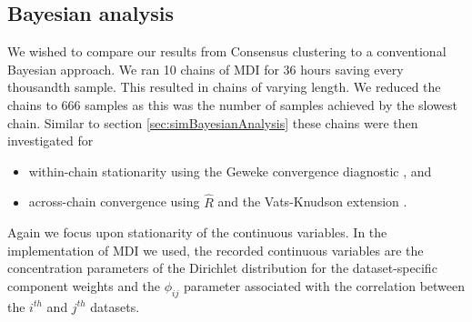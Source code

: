 \documentclass[]{article}
\begin{document}
\subsection{Bayesian analysis} \label{sec:yeastBayesianAnalysis}
We wished to compare our results from Consensus clustering to a conventional Bayesian approach. We ran 10 chains of MDI for 36 hours saving every thousandth sample. This resulted in chains of varying length. We reduced the chains to 666 samples as this was the number of samples achieved by the slowest chain. Similar to section \ref{sec:simBayesianAnalysis} these chains were then investigated for 
\begin{itemize}
	\item within-chain stationarity using the Geweke convergence diagnostic \citep{geweke1991evaluating}, and
	\item across-chain convergence using $\hat{R}$ \citep{gelman1992inference} and the Vats-Knudson extension \citep[\emph{stable $\hat{R}$},][]{vats2018revisiting}.
\end{itemize}
%
%
Again we focus upon stationarity of the continuous variables. In the implementation of MDI we used, the recorded continuous variables are the concentration parameters of the Dirichlet distribution for the dataset-specific component weights and the $\phi_{ij}$ parameter associated with the correlation between the $i^{th}$ and $j^{th}$ datasets. 
\end{document}
